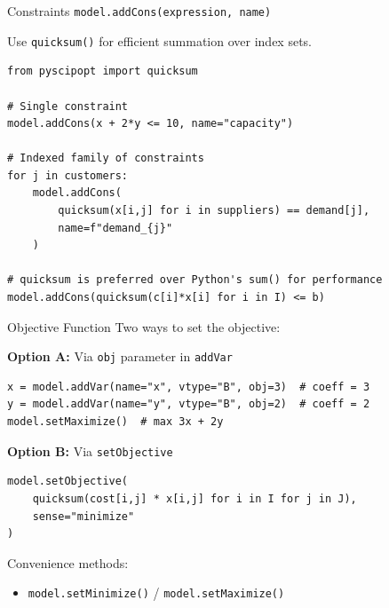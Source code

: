 \documentclass[aspectratio=169,10pt]{beamer}
\begin{document}
\begin{frame}[fragile]{Constraints}
\texttt{model.addCons(expression, name)}

\medskip
Use \texttt{quicksum()} for efficient summation over index sets.

\begin{lstlisting}
from pyscipopt import quicksum

# Single constraint
model.addCons(x + 2*y <= 10, name="capacity")

# Indexed family of constraints
for j in customers:
    model.addCons(
        quicksum(x[i,j] for i in suppliers) == demand[j],
        name=f"demand_{j}"
    )

# quicksum is preferred over Python's sum() for performance
model.addCons(quicksum(c[i]*x[i] for i in I) <= b)
\end{lstlisting}
\end{frame}

\begin{frame}[fragile]{Objective Function}
Two ways to set the objective:

\medskip
\textbf{Option A:} Via \texttt{obj} parameter in \texttt{addVar}
\begin{lstlisting}
x = model.addVar(name="x", vtype="B", obj=3)  # coeff = 3
y = model.addVar(name="y", vtype="B", obj=2)  # coeff = 2
model.setMaximize()  # max 3x + 2y
\end{lstlisting}

\medskip
\textbf{Option B:} Via \texttt{setObjective}
\begin{lstlisting}
model.setObjective(
    quicksum(cost[i,j] * x[i,j] for i in I for j in J),
    sense="minimize"
)
\end{lstlisting}

\medskip
Convenience methods:
\begin{itemize}
  \item \texttt{model.setMinimize()} / \texttt{model.setMaximize()}
\end{itemize}
\end{frame}
\end{document}
